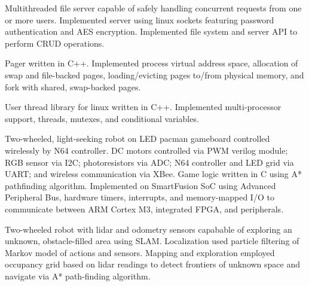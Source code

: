 \documentclass[11pt, a4paper]{cv}
\begin{document}
\begin{cv}
\begin{projects}
\begin{cventries}
{\begin{cvparagraph}
\end{cvparagraph}}
\cventry
{}
{}
{}
{}
{\begin{cvparagraph}
Multithreaded file server capable of safely handling concurrent requests from one or more users. Implemented server using linux sockets featuring password authentication and AES encryption. Implemented file system and server API to perform CRUD operations.
\end{cvparagraph}}
\cventry
{}
{}
{}
{}
{\begin{cvparagraph}
Pager written in C++. Implemented process virtual address space, allocation of swap and file-backed pages, loading/evicting pages to/from physical memory, and fork with shared, swap-backed pages.
\end{cvparagraph}}
\cventry
{}
{}
{}
{}
{\begin{cvparagraph}
User thread library for linux written in C++. Implemented multi-processor support, threads, mutexes, and conditional variables.
\end{cvparagraph}}
\cventry
{}
{}
{}
{}
{\begin{cvparagraph}
Two-wheeled, light-seeking robot on LED pacman gameboard controlled wirelessly by N64 controller. DC motors controlled via PWM verilog module; RGB sensor via I2C; photoresistors via ADC; N64 controller and LED grid via UART; and wireless communication via XBee. Game logic written in C using A* pathfinding algorithm. Implemented on SmartFusion SoC using Advanced Peripheral Bus, hardware timers, interrupts, and memory-mapped I/O to communicate between ARM Cortex M3, integrated FPGA, and peripherals.
\end{cvparagraph}}
\cventry
{}
{}
{}
{}
{\begin{cvparagraph}
Two-wheeled robot with lidar and odometry sensors capabable of exploring an unknown, obstacle-filled area using SLAM. Localization used particle filtering of Markov model of actions and sensors. Mapping and exploration employed occupancy grid based on lidar readings to detect frontiers of unknown space and navigate via A* path-finding algorithm.
\end{cvparagraph}}
\cventry
{}

\end{cventries}
\end{projects}
\end{cv}
\end{document}
